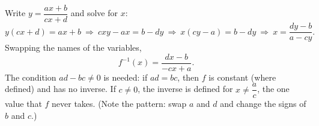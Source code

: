 Write $y=\dfrac{ax+b}{cx+d}$ and solve for $x$:
\[
y(cx+d)=ax+b\ \Longrightarrow\ cxy-ax=b-dy\ \Longrightarrow\ x(cy-a)=b-dy\ \Longrightarrow\ x=\dfrac{dy-b}{a-cy}.
\]
Swapping the names of the variables,
\[
\boxed{f^{-1}(x)=\dfrac{dx-b}{-cx+a}} .
\]
The condition $ad-bc\ne0$ is needed: if $ad=bc$, then $f$ is constant (where defined) and has no inverse. If $c\ne0$, the inverse is defined for $x\ne\dfrac {a}{c}$, the one value that $f$ never takes. (Note the pattern: swap $a$ and $d$ and change the signs of $b$ and $c$.)
